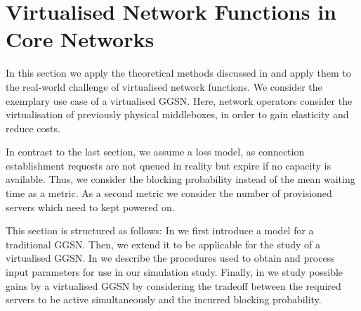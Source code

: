 \section{Virtualised Network Functions in  Core Networks}\label{sec:cloud:virtualized_network_functions}
\newcommand{\blockingprobability}[0]{p_B}
\newcommand{\maxServers}[0]{S_{\max}}
In this section we apply the theoretical methods discussed in  and apply them to the real-world challenge of virtualised network functions.
We consider the exemplary use case of a virtualised \gls{GGSN}.
Here, network operators consider the virtualisation of previously physical middleboxes, in order to gain elasticity and reduce costs.

In contrast to the last section, we assume a loss model, as connection establishment requests are not queued in reality but expire if no capacity is available.
Thus, we consider the blocking probability instead of the mean waiting time as a metric.
As a second metric we consider the number of provisioned servers which need to kept powered on. 

This section is structured as follows:
In  we first introduce a model for a traditional \gls{GGSN}.
Then, we extend it to be applicable for the study of a virtualised \gls{GGSN}.
In  we describe the procedures used to obtain and process input parameters for use in our simulation study.
Finally, in  we study possible gains by a virtualised \gls{GGSN} by considering the tradeoff between the required servers to be active simultaneously and the incurred blocking probability. 



